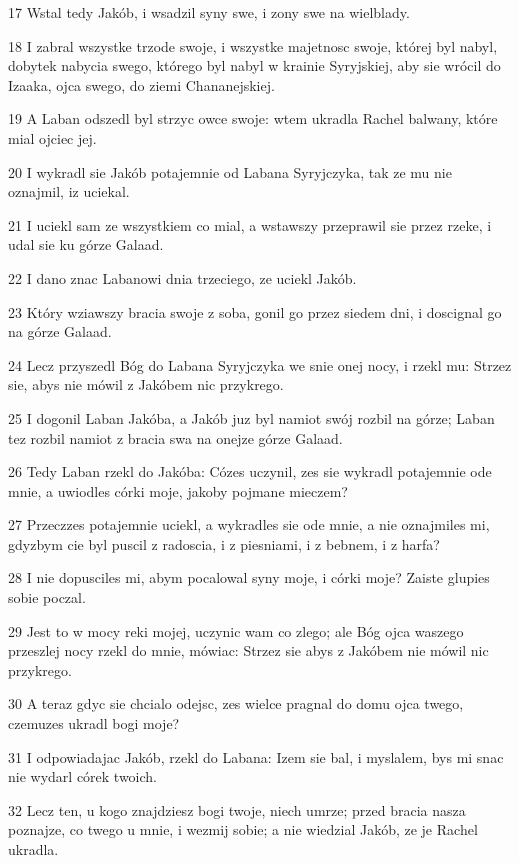 \par 17 Wstal tedy Jakób, i wsadzil syny swe, i zony swe na wielblady.
\par 18 I zabral wszystke trzode swoje, i wszystke majetnosc swoje, której byl nabyl, dobytek nabycia swego, którego byl nabyl w krainie Syryjskiej, aby sie wrócil do Izaaka, ojca swego, do ziemi Chananejskiej.
\par 19 A Laban odszedl byl strzyc owce swoje: wtem ukradla Rachel balwany, które mial ojciec jej.
\par 20 I wykradl sie Jakób potajemnie od Labana Syryjczyka, tak ze mu nie oznajmil, iz uciekal.
\par 21 I uciekl sam ze wszystkiem co mial, a wstawszy przeprawil sie przez rzeke, i udal sie ku górze Galaad.
\par 22 I dano znac Labanowi dnia trzeciego, ze uciekl Jakób.
\par 23 Który wziawszy bracia swoje z soba, gonil go przez siedem dni, i doscignal go na górze Galaad.
\par 24 Lecz przyszedl Bóg do Labana Syryjczyka we snie onej nocy, i rzekl mu: Strzez sie, abys nie mówil z Jakóbem nic przykrego.
\par 25 I dogonil Laban Jakóba, a Jakób juz byl namiot swój rozbil na górze; Laban tez rozbil namiot z bracia swa na onejze górze Galaad.
\par 26 Tedy Laban rzekl do Jakóba: Cózes uczynil, zes sie wykradl potajemnie ode mnie, a uwiodles córki moje, jakoby pojmane mieczem?
\par 27 Przeczzes potajemnie uciekl, a wykradles sie ode mnie, a nie oznajmiles mi, gdyzbym cie byl puscil z radoscia, i z piesniami, i z bebnem, i z harfa?
\par 28 I nie dopusciles mi, abym pocalowal syny moje, i córki moje? Zaiste glupies sobie poczal.
\par 29 Jest to w mocy reki mojej, uczynic wam co zlego; ale Bóg ojca waszego przeszlej nocy rzekl do mnie, mówiac: Strzez sie abys z Jakóbem nie mówil nic przykrego.
\par 30 A teraz gdyc sie chcialo odejsc, zes wielce pragnal do domu ojca twego, czemuzes ukradl bogi moje?
\par 31 I odpowiadajac Jakób, rzekl do Labana: Izem sie bal, i myslalem, bys mi snac nie wydarl córek twoich.
\par 32 Lecz ten, u kogo znajdziesz bogi twoje, niech umrze; przed bracia nasza poznajze, co twego u mnie, i wezmij sobie; a nie wiedzial Jakób, ze je Rachel ukradla.
